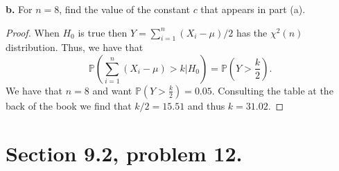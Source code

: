 \documentclass{article}
\renewcommand{\P}[1]{\mathbb{P}\left(#1\right)}
\newenvironment{hwproof}[1]
{
    #1
    \begin{proof}
}{
    \end{proof}
}
\begin{document}
\begin{hwproof}
    {
        \textbf{b.} For $n=8$, find the value of the constant $c$ that appears in part
        (a).
    }
    When $H_0$ is true then $Y = \sum_{i=1}^n(X_i - \mu) / 2$ has the $\chi^2(n)$ distribution.
    Thus, we have that
    \begin{equation*}
        \P{\sum_{i=1}^n(X_i - \mu) > k | H_0} = \P{Y > \frac{k}{2}}.
    \end{equation*}
    We have that $n=8$ and want $\P{Y > \frac{k}{2}} = 0.05$. Consulting the table at the back
    of the book we find that $k/2 = 15.51$ and thus $k = 31.02$.
\end{hwproof}

\section{Section 9.2, problem 12.}
\end{document}
